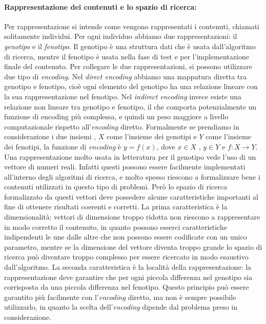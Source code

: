 \documentclass[12pt, italian]{toptesi}
\begin{document}
\paragraph{Rappresentazione dei contenuti e lo spazio di ricerca:}
Per rappresentazione si intende come vengono rappresentati i contenuti, chiamati solitamente individui.
Per ogni individuo abbiamo due rappresentazioni: il \emph{genotipo} e il \emph{fenotipo}.
Il genotipo è una struttura dati che è usata dall'algoritmo di ricerca, mentre il fenotipo è usata nella fase di test e per l'implementazione finale del contenuto.
Per collegare le due rappresentazioni, si possono utilizzare due tipo di \emph{encoding}.
Nel \emph{direct encoding} abbiamo una mappatura diretta tra genotipo e fenotipo, cioè ogni elemento del genotipo ha una relazione 
lineare con la sua rappresentazione nel fenotipo.
Nel \emph{indirect encoding} invece esiste una relazione non lineare tra genotipo e fenotipo, il che comporta potenzialmente
un funzione di encoding più complessa, e quindi un peso maggiore a livello computazionale rispetto all'\emph{encoding} diretto.
Formalmente se prendiamo in considerazione i due insiemi , $X$ come l'insieme dei genotipi e $Y$ come l'insieme dei fenotipi, la funzione di \emph{encoding} è $ y = f(x) $, dove $ x \in X $ ,  $y \in Y $ e $ f: X \to Y.$
Una rappresentazione molto usata in letteratura per il genotipo vede l'uso di un vettore di numeri reali. Infatti questi possono essere facilmente implementati all'interno degli algoritmi di ricerca, e molto spesso riescono a formalizzare bene i contenuti utilizzati in questo tipo di problemi.
Però lo spazio di ricerca formalizzato da questi vettori deve possedere alcune caratteristiche importanti al fine di ottenere risultati coerenti e corretti.
La prima caratteristica è la dimensionalità:  vettori di dimensione troppo ridotta non riescono a rappresentare in modo corretto il contenuto, in quanto possono esserci caratteristiche indipendenti le une dalle altre che non possono essere codificate con un unico parametro, mentre se la dimensione del vettore diventa troppo grande lo spazio di ricerca può diventare troppo complesso per essere ricercato in modo esaustivo dall'algoritmo.
La seconda caratteristica è la località della rappresentazione: la rappresentazione deve garantire che per ogni piccola differenza nel genotipo sia corrisposta da una piccola differenza nel fenotipo. Questo principio può essere garantito più facilmente  con l'\emph{encoding} diretto, ma non è sempre possibile utilizzarlo, in quanto la scelta dell'\emph{encoding} dipende dal problema preso in considerazione.
\end{document}
